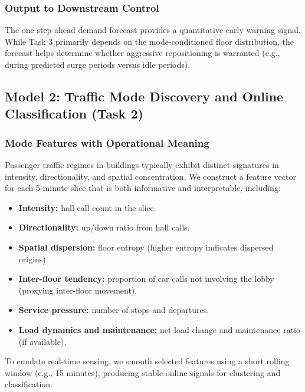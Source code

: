 % 


% 

\subsubsection{Output to Downstream Control}
The one-step-ahead demand forecast provides a quantitative early warning signal. While Task 3 primarily depends on the mode-conditioned floor distribution, the forecast helps determine whether aggressive repositioning is warranted (e.g., during predicted surge periods versus idle periods).

\subsection{Model 2: Traffic Mode Discovery and Online Classification (Task 2)}

\subsubsection{Mode Features with Operational Meaning}
Passenger traffic regimes in buildings typically exhibit distinct signatures in intensity, directionality, and spatial concentration. We construct a feature vector for each 5-minute slice that is both informative and interpretable, including:
\begin{itemize}
    \item \textbf{Intensity:} hall-call count in the slice.
    \item \textbf{Directionality:} up/down ratio from hall calls.
    \item \textbf{Spatial dispersion:} floor entropy (higher entropy indicates dispersed origins).
    \item \textbf{Inter-floor tendency:} proportion of car calls not involving the lobby (proxying inter-floor movement).
    \item \textbf{Service pressure:} number of stops and departures.
    \item \textbf{Load dynamics and maintenance:} net load change and maintenance ratio (if available).
\end{itemize}
To emulate real-time sensing, we smooth selected features using a short rolling window (e.g., 15 minutes), producing stable online signals for clustering and classification.


